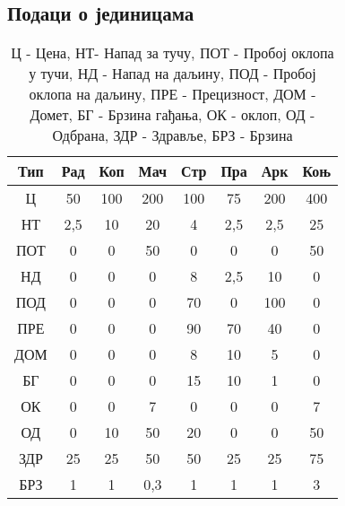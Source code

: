 \documentclass[11pt,a4paper]{article}
\begin{document}
\begin{table}[h!]
\subsection{Подаци о јединицама}
\centering
\begin{tabular}{|| c || c | c | c | c | c | c | c ||}
\hline
Тип & Рад & Коп & Мач & Стр & Пра & Арк & Коњ \\
\hline\hline
Ц & 50 & 100 & 200 & 100 & 75 & 200 & 400\\
\hline
НТ & 2,5 & 10 & 20 & 4 & 2,5 & 2,5 & 25\\
\hline
ПОТ & 0 & 0 & 50 & 0 & 0 & 0 & 50\\
\hline
НД & 0 & 0 & 0 & 8 & 2,5 & 10 & 0\\
\hline
ПОД & 0 & 0 & 0 & 70 & 0 & 100 & 0\\
\hline
ПРЕ & 0 & 0 & 0 & 90 & 70 & 40 & 0\\
\hline
ДОМ & 0 & 0 & 0 & 8 & 10 & 5 & 0\\
\hline
БГ & 0 & 0 & 0 & 15 & 10 & 1 & 0\\
\hline
ОК & 0 & 0 & 7 & 0 & 0 & 0 & 7\\
\hline
ОД & 0 & 10 & 50 & 20 & 0 & 0 & 50\\
\hline
ЗДР & 25 & 25 & 50 & 50 & 25 & 25 & 75\\
\hline
БРЗ & 1 & 1 & 0,3 & 1 & 1 & 1 & 3 \\
\hline

\end{tabular}
\caption{Ц - Цена, НТ- Напад за тучу, ПОТ - Пробој оклопа у тучи, НД - Напад на даљину, ПОД - Пробој оклопа на даљину, ПРЕ - Прецизност, ДОМ - Домет, БГ - Брзина гађања, ОК - оклоп, ОД - Одбрана, ЗДР - Здравље, БРЗ - Брзина }
\end{table}
\end{document}
